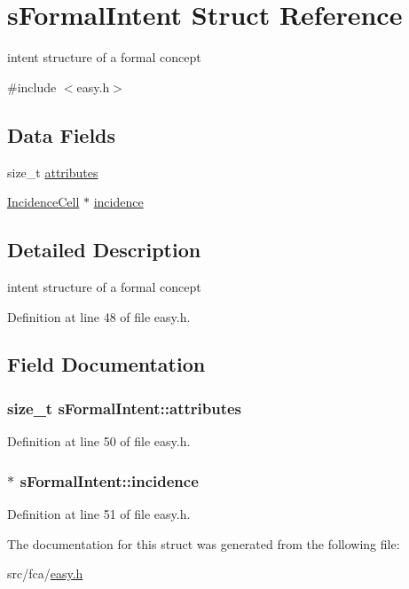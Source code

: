 \hypertarget{structsFormalIntent}{\section{s\-Formal\-Intent \-Struct \-Reference}
\label{structsFormalIntent}
}


intent structure of a formal concept  




{\ttfamily \#include $<$easy.\-h$>$}

\subsection*{\-Data \-Fields}
\begin{DoxyCompactItemize}
\item 
size\-\_\-t \hyperlink{structsFormalIntent_a74e2f2885fae7bdfe1ecf1b3a161d625}{attributes}
\item 
\hyperlink{easy_8h_a92fa84ef7a12663bb998f141ab729056}{\-Incidence\-Cell} $\ast$ \hyperlink{structsFormalIntent_a81eeab9acf7444b47416e4b72dea0462}{incidence}
\end{DoxyCompactItemize}


\subsection{\-Detailed \-Description}
intent structure of a formal concept 

\-Definition at line 48 of file easy.\-h.



\subsection{\-Field \-Documentation}
\hypertarget{structsFormalIntent_a74e2f2885fae7bdfe1ecf1b3a161d625}{
\subsubsection[{attributes}]{\setlength{\rightskip}{0pt plus 5cm}size\-\_\-t {\bf s\-Formal\-Intent\-::attributes}}}\label{structsFormalIntent_a74e2f2885fae7bdfe1ecf1b3a161d625}


\-Definition at line 50 of file easy.\-h.

\hypertarget{structsFormalIntent_a81eeab9acf7444b47416e4b72dea0462}{
\subsubsection[{incidence}]{$\ast$ {\bf s\-Formal\-Intent\-::incidence}}}\label{structsFormalIntent_a81eeab9acf7444b47416e4b72dea0462}


\-Definition at line 51 of file easy.\-h.



\-The documentation for this struct was generated from the following file\-:\begin{DoxyCompactItemize}
\item 
src/fca/\hyperlink{easy_8h}{easy.\-h}\end{DoxyCompactItemize}
